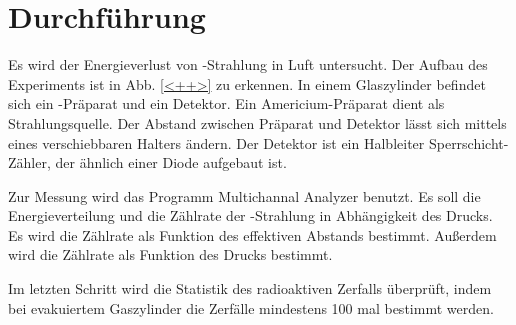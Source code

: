 \section{Durchführung}
\label{sec:Durchführung}

Es wird der Energieverlust von \alpha-Strahlung in Luft untersucht. 
Der Aufbau des Experiments ist in Abb. \ref{<++>} zu erkennen. In einem Glaszylinder befindet sich ein \alpha-Präparat und ein Detektor. Ein Americium-Präparat dient als Strahlungsquelle. Der Abstand zwischen Präparat und Detektor lässt sich mittels eines verschiebbaren Halters ändern. Der Detektor ist ein Halbleiter Sperrschicht-Zähler, der ähnlich einer Diode aufgebaut ist. 

Zur Messung wird das Programm Multichannal Analyzer benutzt. 
Es soll die Energieverteilung und die Zählrate der \alpha-Strahlung in Abhängigkeit des Drucks. Es wird die Zählrate als Funktion des effektiven Abstands bestimmt. Außerdem wird die Zählrate als Funktion des Drucks bestimmt. 

Im letzten Schritt wird die Statistik des radioaktiven Zerfalls überprüft, indem bei evakuiertem Gaszylinder die Zerfälle mindestens 100 mal bestimmt werden. 
